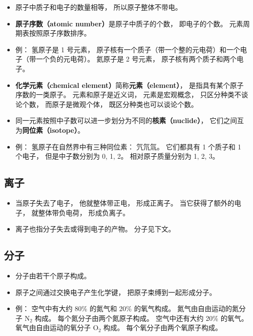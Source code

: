 \begin{itemize}
\item 原子中质子和电子的数量相等， 所以原子整体不带电。
\item \textbf{原子序数（atomic number）}是原子中质子的个数， 即电子的个数。 元素周期表按照原子序数排序。
\item 例： 氢原子是 1 号元素， 原子核有一个质子（带一个整的元电荷）和一个电子（带一个负的元电荷）。 氦原子是 2 号元素， 原子核有两个质子和两个电子。
\item \textbf{化学元素（chemical element）}简称\textbf{元素（element）}， 是指具有某个原子序数的一类原子。 元素和原子是近义词， 元素是宏观概念， 只区分种类不谈论个数， 而原子是微观个体， 既区分种类也可以谈论个数。
\item 同一元素按照中子数可以进一步划分为不同的\textbf{核素（nuclide）}， 它们之间互为\textbf{同位素（isotope）}。
\item 例： 氢原子在自然界中有三种同位素： 氕氘氚。 它们都具有 1 个质子和 1 个电子， 但是中子数分别为 0, 1, 2。 相对原子质量分别为 1, 2, 3。
\end{itemize}

\subsection{离子}
\begin{itemize}
\item 当原子失去了电子， 他就整体带正电， 形成正离子。 当它获得了额外的电子， 就整体带负电荷， 形成负离子。
\item 离子也指分子失去或得到电子的产物。 分子见下文。
\end{itemize}

\subsection{分子}
\begin{itemize}
\item 分子由若干个原子构成。
\item 原子之间通过交换电子产生化学键， 把原子束缚到一起形成分子。
\item 例： 空气中有大约 80\% 的氮气和 20\% 的氧气构成。 氮气由自由运动的氮分子 $\mathrm{N}_2$ 构成。 每个氮分子由两个氮原子构成。 空气中还有大约 20\% 的氧气。 氧气由自由运动的氧分子 $\mathrm{O}_2$ 构成。 每个氧分子由两个氧原子构成。
\end{itemize}
